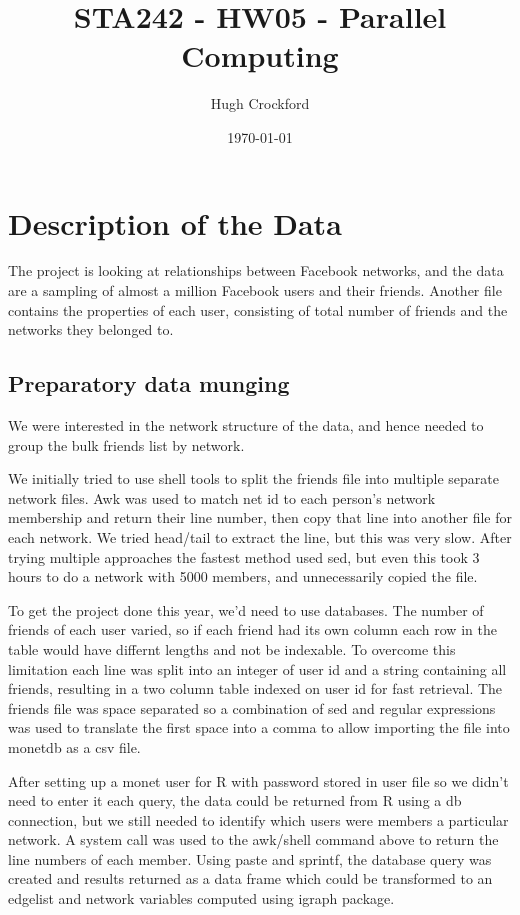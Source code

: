 \documentclass[12pt]{article}
\title{STA242 - HW05 - Parallel Computing}
\author{Hugh Crockford}
\date{\today}
\begin{document}
	\maketitle
	\section{Description of the Data}

		The project is looking at relationships between Facebook networks, and the data are a sampling of almost a million Facebook users and their friends.
		Another file contains the properties of each user, consisting of total number of friends and the networks they belonged to.


		
		\subsection{Preparatory data munging}
		We were interested in the network structure of the data, and hence needed to group the bulk friends list by network.


		We initially tried to use shell tools to split the friends file into multiple separate network files. %
		Awk was used to match net id to each person's network membership and return their line number, then copy that line into another file for each network. 
		We tried head/tail to extract the line, but this was very slow. After trying multiple approaches the fastest method used sed, but even this took 3 hours to do a network with 5000 members, and unnecessarily copied the file.


		To get the project done this year, we'd need to use databases.
		The number of friends of each user varied, so if each friend had its own column each row in the table would have differnt lengths and not be indexable.
		To overcome this limitation each line was split into an integer of user id and a string containing all friends, resulting in a two column table indexed on user id for fast retrieval.
		The friends file was space separated so a combination of sed and regular expressions was used to translate the first space into a comma to allow importing the file into monetdb as a csv file.


		After setting up a monet user for R with password stored in user file so we didn't need to enter it each query, the data could be returned from R using a db connection, but we still needed to identify which users were members a particular network.
		A system call was used to the awk/shell command above to return the line numbers of each member. %
		Using paste and sprintf, the database query was created and results returned as a data frame which could be transformed to an edgelist and network variables computed using igraph package.
\end{document}
